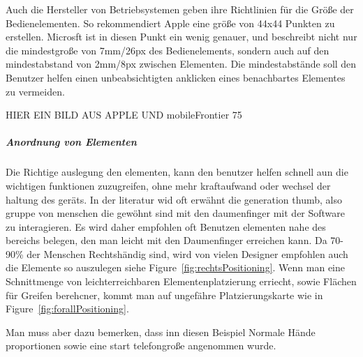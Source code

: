 Auch die Hersteller von Betriebsystemen geben ihre Richtlinien für die Größe der Bedienelementen. So rekommendiert Apple eine größe von 44x44 Punkten zu erstellen\cite{Apple}. Microsft ist in diesen Punkt ein wenig genauer, und beschreibt nicht nur die mindestgroße von 7mm/26px des Bedienelements, sondern auch auf den mindestabstand von 2mm/8px zwischen Elementen\cite{lukeGUI}. Die mindestabstände soll den Benutzer helfen einen unbeabsichtigten anklicken eines benachbartes Elementes zu vermeiden. 

HIER EIN BILD AUS APPLE UND mobileFrontier 75

\subparagraph{Anordnung von Elementen} 
\label{subp:anordnung_von_elementen}

Die Richtige auslegung den elementen, kann den benutzer helfen schnell aun die wichtigen funktionen zuzugreifen, ohne mehr kraftaufwand oder wechsel der haltung des geräts. In der literatur wid oft erwähnt die generation thumb, also gruppe von menschen die gewöhnt sind mit den daumenfinger mit der Software zu interagieren. Es wird daher empfohlen oft Benutzen elementen nahe des bereichs belegen, den man leicht mit den Daumenfinger erreichen kann. Da 70-90\% der Menschen  Rechtshändig sind, wird von vielen Designer empfohlen auch die Elemente so auszulegen siehe Figure~\ref{fig:rechtsPositioning}. Wenn man eine Schnittmenge von leichterreichbaren Elementenplatzierung erriecht, sowie Flächen für Greifen berehcner, kommt man auf ungefähre Platzierungskarte wie in Figure~\ref{fig:forallPositioning}. 

Man muss aber dazu bemerken, dass inn diesen Beispiel Normale Hände proportionen sowie eine start telefongroße angenommen wurde.


